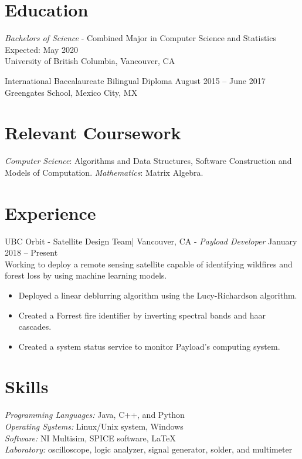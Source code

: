 \documentclass[letter]{res}
\begin{document}
\address{ (778)-882-3453 \\}
\address{
  \texttt{julian@mentasti.net}\\ } 
\begin{resume}
  \noindent\makebox[\linewidth]{\rule{\paperwidth}{0.4pt}}

\section{Education}
{\sl Bachelors of Science} - Combined Major in Computer Science and Statistics \hfill Expected: May 2020\\
University of British Columbia,  Vancouver, CA
  \vspace{-2mm}
  
International Baccalaureate Bilingual Diploma \hfill August 2015 – June 2017\\
Greengates School, Mexico City, MX
\section{Relevant Coursework}
  {\sl Computer Science}: Algorithms and Data Structures, Software Construction and Models of Computation.
  {\sl Mathematics}: Matrix Algebra.

\section{Experience}
UBC Orbit - Satellite Design Team| Vancouver, CA \newline
 - {\sl Payload Developer} \hfill January 2018 – Present\\
 Working to deploy a remote sensing satellite capable of identifying wildfires and forest loss by using machine learning models.\\
 \vspace{-2mm}
 \begin{itemize}
 \item Deployed a linear deblurring algorithm using the Lucy-Richardson algorithm.
 \item Created a Forrest fire identifier by inverting spectral bands and haar cascades. 
 \item Created a system status service to monitor Payload's computing system. 
 \end{itemize}
   \vspace{-2mm}
   
\section{Skills}
{\sl Programming Languages:}  Java, C++, and Python\\
{\sl Operating Systems:} Linux/Unix system, Windows \\ 
{\sl Software:} NI Multisim, SPICE software,  \LaTeX \\ 
{\sl Laboratory:}  oscilloscope, logic analyzer, signal generator, solder, and multimeter \\
 \vspace{-2mm}


\end{resume}
\end{document}
